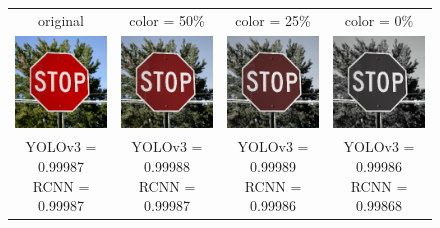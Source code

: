 \documentclass{article}
\begin{document}
\begin{figure}[h]
\centering
\begin{tabular}{ c c c c }
    original & color = 50\% & color = 25\% & color = 0\% \\
    \includegraphics[width=0.2\linewidth]{../test_images/stop.png} & \includegraphics[width=0.2\linewidth]{../test_images/perturbed/stop_grayscale_0_500.png} & \includegraphics[width=0.2\linewidth]{../test_images/perturbed/stop_grayscale_0_250.png} & \includegraphics[width=0.2\linewidth]{../test_images/perturbed/stop_grayscale_0_010.png} \\
    \makecell{YOLOv3 = 0.99987 \\ RCNN = 0.99987} & \makecell{YOLOv3 = 0.99988 \\ RCNN = 0.99987} & \makecell{YOLOv3 = 0.99989 \\ RCNN = 0.99986} & \makecell{YOLOv3 = 0.99986 \\ RCNN = 0.99868} \\[1cm]

\end{tabular}
\end{figure}
\end{document}

